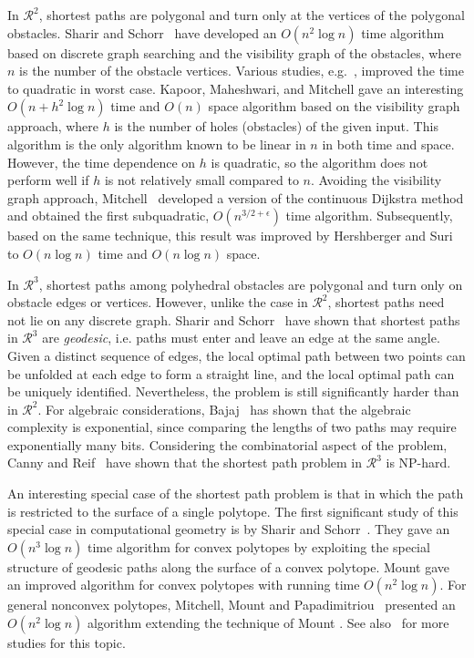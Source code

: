 \documentclass{llncs}
\begin{document}
In $\mathcal{R}^2$, shortest paths are polygonal and turn only at the vertices of the polygonal obstacles.
Sharir and Schorr~\cite{Sharir86} have developed an $O(n^2\log n)$ time algorithm based on discrete
graph searching and the visibility graph of the obstacles, where $n$ is the number of the obstacle
vertices. Various studies, e.g.~\cite{GM87,KM88,OW88}, improved the time to quadratic in worst case.
Kapoor, Maheshwari, and Mitchell \cite{KMM97} gave an interesting $O(n+h^2\log n)$ time and $O(n)$
space algorithm based on the visibility graph approach, where $h$ is the number of holes (obstacles)
of the given input. This algorithm is the only algorithm known to be linear in $n$ in both time and space.
However, the time dependence on $h$ is quadratic, so the algorithm does not perform well if $h$ is not
relatively small compared to $n$. Avoiding the visibility graph approach, Mitchell~\cite{Mit96} developed
a version of the continuous Dijkstra method and obtained the first subquadratic, $O(n^{3/2+\epsilon})$
time algorithm. Subsequently, based on the same technique, this result was improved by Hershberger
and Suri~\cite{Her99} to $O(n\log n)$ time and $O(n \log n)$ space.

In $\mathcal{R}^3$, shortest paths among polyhedral obstacles are polygonal and turn only on obstacle
edges or vertices. However, unlike the case in $\mathcal{R}^2$, shortest paths need not lie on any
discrete graph. Sharir and Schorr~\cite{Sharir86} have shown that shortest paths in $\mathcal{R}^3$
are {\it geodesic}, i.e. paths must enter and leave an edge at the same angle. Given a distinct sequence
of edges, the local optimal path between two points can be unfolded at each edge to form a straight line,
and the local optimal path can be uniquely identified. Nevertheless, the problem is still significantly
harder than in $\mathcal{R}^2$. For algebraic considerations, Bajaj~\cite{Bajaj85, Bajaj88} has shown
that the algebraic complexity is exponential, since comparing the lengths of two paths may require
exponentially many bits.
Considering the combinatorial aspect of the problem, Canny and Reif~\cite{reif} have shown that the
shortest path problem in $\mathcal{R}^3$ is NP-hard.

An interesting special case of the shortest path problem is that in which the path is
restricted to the surface of a single polytope.
The first significant study of this special case in computational
geometry  is by Sharir and Schorr~\cite{Sharir86}. They gave an $O(n^3\log n)$ time
algorithm for convex polytopes by exploiting the special structure of geodesic paths along the surface
of a convex polytope. Mount \cite{Mount84} gave an improved algorithm for convex polytopes with running
time $O(n^2\log n)$. For general nonconvex polytopes, Mitchell, Mount and Papadimitriou~\cite{Mit87}
presented an $O(n^2\log n)$ algorithm extending the technique of Mount \cite{Mount84}.
See also~\cite{chen,agarwal,har-peled,sharir} for more studies for this topic.
\end{document}
